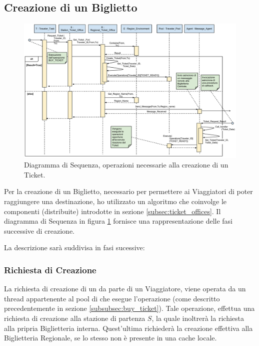 \newpage
\subsection{Creazione di un Biglietto}

	\begin{figure}[htbp]
		\includegraphics[trim = 55mm 0mm 0mm 0mm,scale=0.43]{imgs/Buy_Ticket_Sequence_Diagram.pdf}
		\caption{\footnotesize{Diagramma di Sequenza, operazioni necessarie alla creazione di un Ticket.}}
		\label{fig:ticket_creation_diagram}
	\end{figure}

Per la creazione di un Biglietto, necessario per permettere ai Viaggiatori di poter raggiungere una destinazione, ho utilizzato un algoritmo che coinvolge le componenti (distribuite) introdotte in sezione \ref{subsec:ticket_offices}.
Il diagramma di Sequenza in figura \ref{fig:ticket_creation_diagram} fornisce una rappresentazione delle fasi successive di creazione.


La descrizione sarà suddivisa in fasi sucessive:

	\subsubsection {Richiesta di Creazione}
	
	La richiesta di creazione di un  da parte di un Viaggiatore, viene operata da un thread appartenente al pool di  che esegue l'operazione  (come descritto precedentemente in sezione \ref{subsubsec:buy_ticket}). Tale operazione, effettua una richiesta di creazione alla stazione di partenza $S$, la quale inoltrerà la richiesta alla pripria Biglietteria interna. Quest'ultima richiederà la creazione effettiva alla Biglietteria Regionale, se lo stesso  non è presente in una cache locale.  
	
